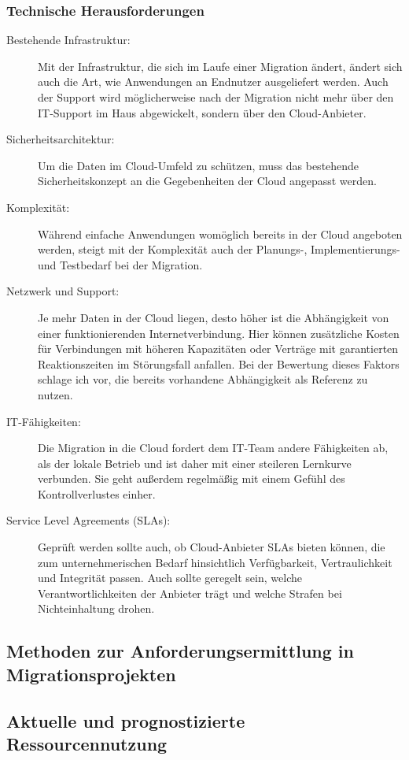 \subsubsection{Technische Herausforderungen}
\begin{description}
	\item[Bestehende Infrastruktur:] Mit der Infrastruktur, die sich im 
Laufe einer Migration ändert, ändert sich auch die Art, wie Anwendungen an 
Endnutzer ausgeliefert werden. Auch der Support wird möglicherweise nach der 
Migration nicht mehr über den IT-Support im Haus abgewickelt, sondern über den 
Cloud-Anbieter. 
	\item[Sicherheitsarchitektur:] Um die Daten im Cloud-Umfeld zu 
schützen, muss das bestehende Sicherheitskonzept an die Gegebenheiten der Cloud 
angepasst werden.
	\item[Komplexität:]
	Während einfache Anwendungen womöglich bereits in der Cloud angeboten 
werden, steigt mit der Komplexität auch der Planungs-, Implementierungs- 
und Testbedarf bei der Migration.
	\item[Netzwerk und Support:] Je mehr Daten in der Cloud liegen, desto 
höher ist die Abhängigkeit von einer funktionierenden Internetverbindung. Hier 
können zusätzliche Kosten für Verbindungen mit höheren Kapazitäten oder 
Verträge mit garantierten Reaktionszeiten im Störungsfall anfallen. Bei der 
Bewertung dieses Faktors schlage ich vor, die bereits vorhandene Abhängigkeit 
als Referenz zu nutzen. 
	\item[IT-Fähigkeiten:] Die Migration in die Cloud fordert dem IT-Team 
andere Fähigkeiten ab, als der lokale Betrieb und ist daher mit einer steileren 
Lernkurve verbunden. Sie geht außerdem regelmäßig mit einem Gefühl des 
Kontrollverlustes einher. 
	\item[Service Level Agreements (SLAs):] Geprüft werden sollte auch, ob 
Cloud-Anbieter SLAs bieten können, die zum unternehmerischen Bedarf 
hinsichtlich Verfügbarkeit, Vertraulichkeit und Integrität passen. Auch sollte 
geregelt sein, welche Verantwortlichkeiten der Anbieter trägt und welche 
Strafen bei Nichteinhaltung drohen.
\end{description}



\subsection{Methoden zur Anforderungsermittlung in Migrationsprojekten}
\subsection{Aktuelle und prognostizierte Ressourcennutzung}

